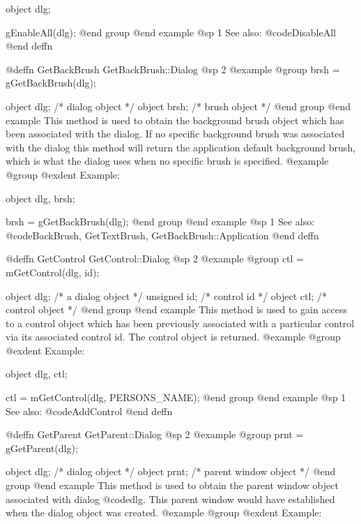 object  dlg;

gEnableAll(dlg);
@end group
@end example
@sp 1
See also:  @code{DisableAll}
@end deffn




@deffn {GetBackBrush} GetBackBrush::Dialog
@sp 2
@example
@group
brsh = gGetBackBrush(dlg);

object  dlg;    /*  dialog object  */
object  brsh;   /*  brush object   */
@end group
@end example
This method is used to obtain the background brush object which has been
associated with the dialog.  If no specific background brush was
associated with the dialog this method will return the application
default background brush, which is what the dialog uses when no specific
brush is specified.
@example
@group
@exdent Example:

object  dlg, brsh;

brsh = gGetBackBrush(dlg);
@end group
@end example
@sp 1
See also:  @code{BackBrush, GetTextBrush, GetBackBrush::Application}
@end deffn









@deffn {GetControl} GetControl::Dialog
@sp 2
@example
@group
ctl = mGetControl(dlg, id);

object  dlg;    /*  a dialog object  */
unsigned id;    /*  control id       */
object  ctl;    /*  control object   */
@end group
@end example
This method is used to gain access to a control object which has been
previously associated with a particular control via its associated
control id.  The control object is returned.
@example
@group
@exdent Example:

object  dlg, ctl;

ctl = mGetControl(dlg, PERSONS_NAME);
@end group
@end example
@sp 1
See also:  @code{AddControl}
@end deffn












@deffn {GetParent} GetParent::Dialog
@sp 2
@example
@group
prnt = gGetParent(dlg);

object  dlg;    /*  dialog object         */
object  prnt;   /*  parent window object  */
@end group
@end example
This method is used to obtain the parent window object associated
with dialog @code{dlg}.  This parent window would have established
when the dialog object was created.
@example
@group
@exdent Example:

